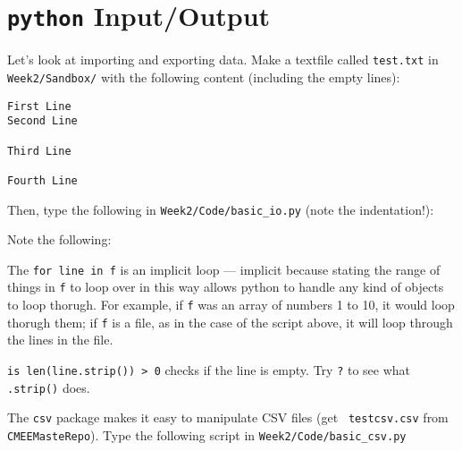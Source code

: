 \section{{\tt python} Input/Output}

Let's look at importing and exporting data.  Make a textfile called 
{\tt test.txt} in {\tt Week2/Sandbox/} with the following content 
(including the empty lines):

\begin{lstlisting}
First Line
Second Line

Third Line

Fourth Line
\end{lstlisting}

Then, type the following in {\tt Week2/Code/basic\_io.py} (note the 
indentation!):



Note the following:

\begin{compactitem}
	\item The {\tt for line in f} is an implicit loop --- implicit 
	because stating the range of things in {\tt f} to loop over in this 
	way allows python to handle any kind of objects to loop thorugh. For 
	example, if {\tt f} was an array of numbers 1 to 10, it would loop 
	thorugh them; if {\tt f} is a file, as in the case of the script 
	above, it will loop through the lines in the file.
	
	\item {\tt is len(line.strip()) > 0} checks if the line is empty. Try 
	{\tt ?} to see what {\tt .strip()} does.	 
\end{compactitem}

The {\tt csv} package makes it easy to manipulate CSV files (get {\tt 
testcsv.csv} from {\tt CMEEMasteRepo}). Type the following script in 
{\tt Week2/Code/basic\_csv.py}
  


